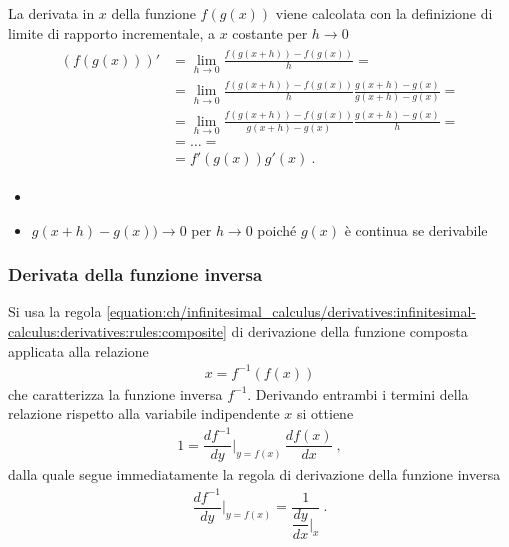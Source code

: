 \documentclass[letterpaper,10pt,italian]{jupyterBook}
\begin{document}
\sphinxAtStartPar
La derivata in \(x\) della funzione \(f(g(x))\) viene calcolata con la definizione di limite di rapporto incrementale, a \(x\) costante per \(h \rightarrow 0\)
\begin{equation*}
\begin{split}\begin{aligned}
  \left( f(g(x)) \right)' 
  & = \lim_{h \rightarrow 0} \frac{ f(g(x+h)) - f(g(x)) }{h} = \\
  & = \lim_{h \rightarrow 0} \frac{ f(g(x+h)) - f(g(x)) }{h} \frac{g(x+h) - g(x)}{g(x+h)-g(x)} = \\
  & = \lim_{h \rightarrow 0} \frac{ f(g(x+h)) - f(g(x)) }{g(x+h) - g(x)} \frac{g(x+h)-g(x)}{h} = \\
  & = \dots = \\
  & = f'\left( g(x) \right) g'(x) \ .
\end{aligned}\end{split}
\end{equation*}\begin{itemize}
\item {} 
\sphinxAtStartPar
{} 

\item {} 
\sphinxAtStartPar
{} \(g(x+h) - g(x)) \rightarrow 0\) per \(h \rightarrow 0\) poiché \(g(x)\) è continua se derivabile

\end{itemize}
\subsubsection*{Derivata della funzione inversa}

\sphinxAtStartPar
Si usa la regola \eqref{equation:ch/infinitesimal_calculus/derivatives:infinitesimal-calculus:derivatives:rules:composite} di derivazione della funzione composta applicata alla relazione
\begin{equation*}
\begin{split}x = f^{-1} \left( f(x) \right)\end{split}
\end{equation*}
\sphinxAtStartPar
che caratterizza la funzione inversa \(f^{-1}\). Derivando entrambi i termini della relazione rispetto alla variabile indipendente \(x\) si ottiene
\begin{equation*}
\begin{split}1 = \dfrac{d f^{-1}}{d y}\bigg|_{y = f(x)} \, \dfrac{d f(x)}{d x} \ ,\end{split}
\end{equation*}
\sphinxAtStartPar
dalla quale segue immediatamente la regola di derivazione della funzione inversa
\begin{equation*}
\begin{split} \dfrac{d f^{-1}}{d y}\bigg|_{y = f(x)} = \dfrac{1}{ \dfrac{d y}{d x}\bigg|_{x}} \ .\end{split}
\end{equation*}
\end{document}
